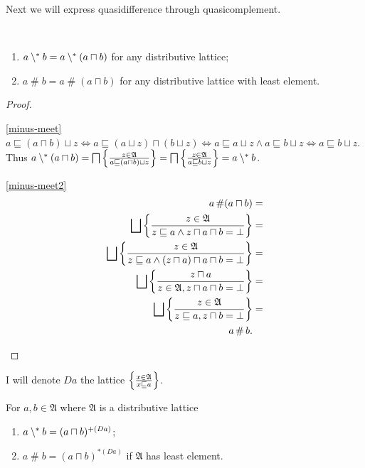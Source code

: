 Next we will express quasidifference through quasicomplement.
\begin{prop}
~
\begin{enumerate}
\item \label{minus-meet}$a\setminus^{\ast} b=a\setminus^{\ast}(a\sqcap b)$ for any
distributive lattice;
\item \label{minus-meet2}$a\mathop\#b=a\mathop\#(a\sqcap b)$ for any distributive
lattice with least element.
\end{enumerate}
\end{prop}
\begin{proof}
~
\begin{widedisorder}
\item [{\ref{minus-meet}}] $a\sqsubseteq(a\sqcap b)\sqcup z\Leftrightarrow a\sqsubseteq(a\sqcup z)\sqcap(b\sqcup z)\Leftrightarrow a\sqsubseteq a\sqcup z\land a\sqsubseteq b\sqcup z\Leftrightarrow a\sqsubseteq b\sqcup z$.
Thus $a\setminus^{\ast}(a\sqcap b)=\bigsqcap\left\{ \frac{z\in\mathfrak{A}}{a\sqsubseteq(a\sqcap b)\sqcup z}\right\}=\bigsqcap\left\{ \frac{z\in\mathfrak{A}}{a\sqsubseteq b\sqcup z}\right\}=a\setminus^{\ast} b$.
\item [{\ref{minus-meet2}}] ~
\begin{align*}
a\mathop\#(a\sqcap b) & =\\
\bigsqcup\setcond{z\in\mathfrak{A}}{z\sqsubseteq a\land z\sqcap a\sqcap b=\bot} & =\\
\bigsqcup\setcond{z\in\mathfrak{A}}{z\sqsubseteq a\land(z\sqcap a)\sqcap a\sqcap b=\bot} & =\\
\bigsqcup\setcond{z\sqcap a}{z\in\mathfrak{A},z\sqcap a\sqcap b=\bot} & =\\
\bigsqcup\setcond{z\in\mathfrak{A}}{z\sqsubseteq a,z\sqcap b=\bot} & =\\
a\mathop\#b.
\end{align*}

\end{widedisorder}
\end{proof}
I will denote $Da$ the lattice $\left\{ \frac{x\in\mathfrak{A}}{x\sqsubseteq a}\right\}$.
\begin{thm}
For $a,b\in\mathfrak{A}$ where $\mathfrak{A}$ is a distributive
lattice
\begin{enumerate}
\item \label{pdiff-comp}$a\setminus^{\ast} b=(a\sqcap b)^{+(Da)}$;
\item \label{sec-pdiff-comp}$a\mathop\#b=(a\sqcap b)^{\ast(Da)}$ if $\mathfrak{A}$
has least element.
\end{enumerate}
\end{thm}

